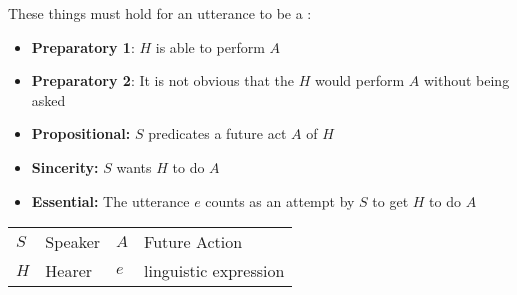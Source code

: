 \documentclass[headrule,footrule]{foils}
\begin{document}



These things must hold for an utterance to be a :
\begin{itemize}
\item \textbf{Preparatory 1}: $H$ is able to perform  $A$
\item \textbf{Preparatory 2}: It is not obvious that the $H$ would perform $A$  without being asked
\item \textbf{Propositional:} $S$ predicates a future act $A$ of $H$
\item \textbf{Sincerity:}  $S$ wants $H$ to do $A$ 
\item \textbf{Essential:} The utterance $e$ counts as an attempt by $S$ to get $H$ to do $A$
\end{itemize}

  \begin{tabular}{llll}
    $S$ & Speaker & $A$ & Future Action \\
    $H$ & Hearer   & $e$ & linguistic expression  \\
  \end{tabular}
\end{document}
